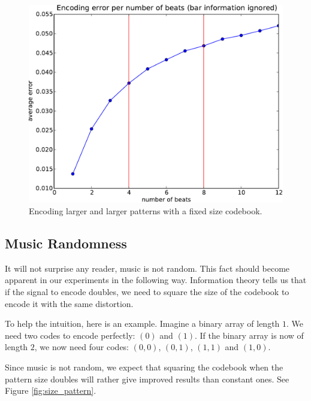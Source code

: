 \documentclass{article}
\begin{document}
\begin{figure}[htb]
\begin{center}
\includegraphics[width=.9\columnwidth]{encoding_per_beat}
\end{center}
\caption{\small{Encoding larger and larger patterns with a fixed size
codebook.}}
\label{fig:perbeat}
\end{figure}

\subsection{Music Randomness}\label{ssec:random}
It will not surprise any reader, music is not random. This fact should
become apparent in our experiments in the following way. Information
theory tells us that if the signal to encode doubles, we need to square
the size of the codebook to encode it with the same distortion.

To help the intuition, here is an example. Imagine a binary array of 
length $1$. We need two
codes to encode perfectly: $(0)$ and $(1)$. If the binary array is now of
length $2$, we now need four codes: $(0,0)$, $(0,1)$, $(1,1)$ and $(1,0)$.

Since music is not random, we expect that squaring the codebook when the
pattern size doubles will rather give improved results than constant ones.
See Figure \ref{fig:size_pattern}.
\end{document}
